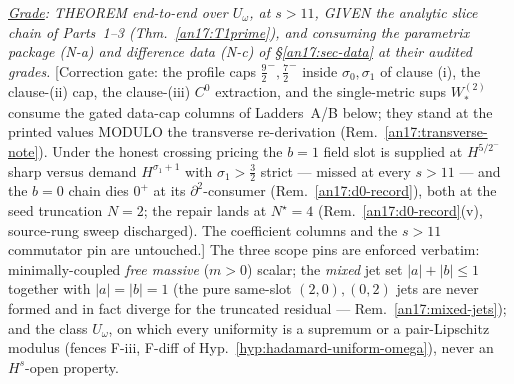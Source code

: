 \begin{lemma}[$N{=}2$ two-slot difference-system energy estimate, slice
register; the mixed $(1,1)$ coincidence value at the Lipschitz rate for
$s>n/2+9=11$, zero slack]
\smallskip
\emph{\underline{Grade}: THEOREM end-to-end over $U_\omega$, at $s>11$, GIVEN
the analytic slice chain of Parts~1--3 (Thm.~\ref{an17:T1prime}), and consuming
the parametrix package \textup{(N-a)} and difference data \textup{(N-c)} of
\S\ref{an17:sec-data} at their audited grades.} \textup{[Correction gate: the
profile caps $\tfrac92^-,\tfrac72^-$ inside $\sigma_0,\sigma_1$ of clause (i),
the clause-(ii) cap, the clause-(iii) $C^0$ extraction, and the single-metric
sups $W^{(2)}_*$ consume the gated data-cap columns of Ladders~A/B below;
they stand at the printed values MODULO the transverse re-derivation
(Rem.~\ref{an17:transverse-note}). Under the honest crossing pricing the
$b{=}1$ field slot is supplied at $H^{5/2^-}$ sharp versus demand
$H^{\sigma_1+1}$ with $\sigma_1>\tfrac32$ strict --- missed at every $s>11$
--- and the $b{=}0$ chain dies $0^+$ at its $\partial^2$-consumer
(Rem.~\ref{an17:d0-record}), both at the seed truncation $N{=}2$; the repair
lands at $N^\star{=}4$ (Rem.~\ref{an17:d0-record}(v), source-rung sweep
discharged). The coefficient columns and the $s>11$
commutator pin are untouched.]} The three scope pins are
enforced verbatim: minimally-coupled \emph{free massive} ($m>0$) scalar; the
\emph{mixed} jet set $|a|+|b|\le1$ together with $|a|=|b|=1$ (the pure same-slot
$(2,0),(0,2)$ jets are never formed and in fact diverge for the truncated
residual --- Rem.~\ref{an17:mixed-jets}); and the class $U_\omega$, on which
every uniformity is a supremum or a pair-Lipschitz modulus (fences F-iii,
F-diff of Hyp.~\ref{hyp:hadamard-uniform-omega}), never an $H^s$-open property.
\end{lemma}

